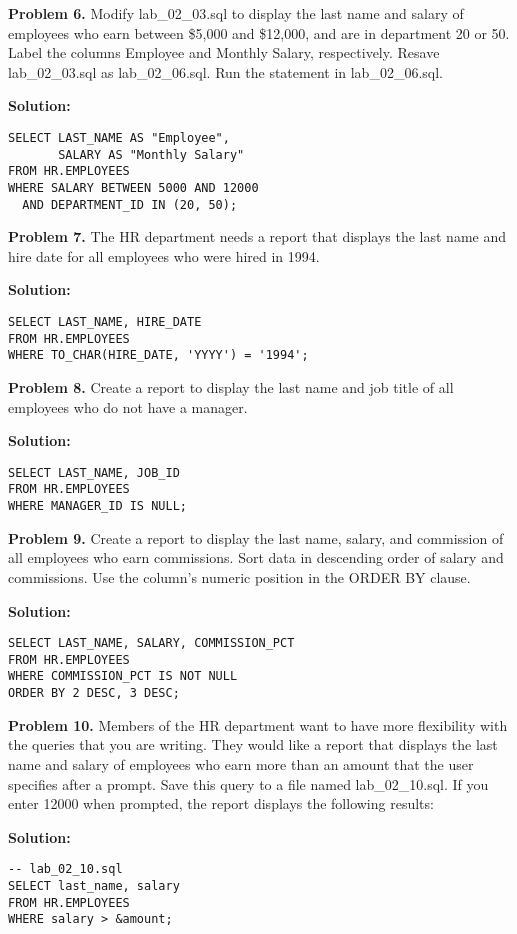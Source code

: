 \documentclass[12pt,a4paper]{article}
\begin{document}
\textbf{Problem 6.} Modify lab\_02\_03.sql to display the last name and salary of employees who earn between \$5,000 and \$12,000, and are in department 20 or 50. Label the columns Employee and Monthly Salary, respectively. Resave lab\_02\_03.sql as lab\_02\_06.sql. Run the statement in lab\_02\_06.sql.

\textbf{Solution:}
\begin{lstlisting}[style=sqlstyle]
SELECT LAST_NAME AS "Employee",
       SALARY AS "Monthly Salary"
FROM HR.EMPLOYEES
WHERE SALARY BETWEEN 5000 AND 12000
  AND DEPARTMENT_ID IN (20, 50);
\end{lstlisting}

\textbf{Problem 7.} The HR department needs a report that displays the last name and hire date for all employees who were hired in 1994.

\textbf{Solution:}
\begin{lstlisting}[style=sqlstyle]
SELECT LAST_NAME, HIRE_DATE
FROM HR.EMPLOYEES
WHERE TO_CHAR(HIRE_DATE, 'YYYY') = '1994';
\end{lstlisting}

\textbf{Problem 8.} Create a report to display the last name and job title of all employees who do not have a manager.

\textbf{Solution:}
\begin{lstlisting}[style=sqlstyle]
SELECT LAST_NAME, JOB_ID
FROM HR.EMPLOYEES
WHERE MANAGER_ID IS NULL;
\end{lstlisting}

\textbf{Problem 9.} Create a report to display the last name, salary, and commission of all employees who earn commissions. Sort data in descending order of salary and commissions. Use the column's numeric position in the ORDER BY clause.

\textbf{Solution:}
\begin{lstlisting}[style=sqlstyle]
SELECT LAST_NAME, SALARY, COMMISSION_PCT
FROM HR.EMPLOYEES
WHERE COMMISSION_PCT IS NOT NULL
ORDER BY 2 DESC, 3 DESC;
\end{lstlisting}

\textbf{Problem 10.} Members of the HR department want to have more flexibility with the queries that you are writing. They would like a report that displays the last name and salary of employees who earn more than an amount that the user specifies after a prompt. Save this query to a file named lab\_02\_10.sql. If you enter 12000 when prompted, the report displays the following results:

\textbf{Solution:}
\begin{lstlisting}[style=sqlstyle]
-- lab_02_10.sql
SELECT last_name, salary
FROM HR.EMPLOYEES
WHERE salary > &amount;
\end{lstlisting}
\end{document}
